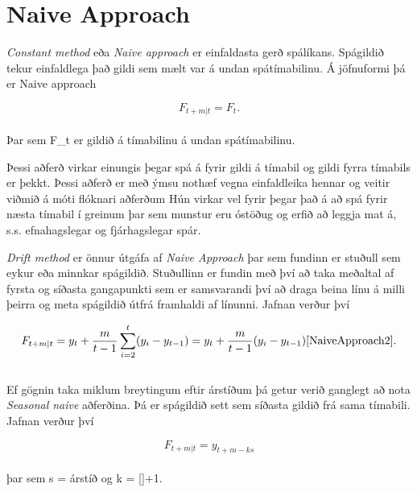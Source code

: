 \section{Naive Approach}
\textit{Constant method} eða \textit{Naive approach} er einfaldasta gerð spálíkans. Spágildið tekur einfaldlega það gildi sem mælt var á undan spátímabilinu. Á jöfnuformi þá er Naive approach

$$F_{t+m|t} = F_t.$$\\

Þar sem F_t er gildið á tímabilinu á undan spátímabilinu.

Þessi aðferð virkar einungis þegar spá á fyrir gildi á tímabil og gildi fyrra tímabils er þekkt.
Þessi aðferð er með ýmsu nothæf vegna einfaldleika hennar og veitir viðmið á móti flóknari aðferðum Hún virkar vel fyrir þegar það á að spá fyrir næsta tímabil í greinum þar sem munstur eru óstöðug og erfið að leggja mat á, s.s. efnahagslegar og fjárhagslegar spár\cite{NaiveApproach}.


\textit{Drift method} er önnur útgáfa af \textit{Naive Approach} þar sem fundinn er stuðull sem eykur eða minnkar spágildið. Stuðullinn er fundin með því að taka meðaltal af fyrsta og síðasta gangapunkti sem er samsvarandi því að draga beina línu á milli þeirra og meta spágildið útfrá framhaldi af línunni. Jafnan verður því

$$F_{t+m|t} = y_t + \frac{m}{t-1}\displaystyle\sum_{i=2}^{t} (y_i-y_{t-1}) = y_t + \frac{m}{t-1}(y_i-y_{t-1}) \cite{NaiveApproach2}.$$\\

Ef gögnin taka miklum breytingum eftir árstíðum þá getur verið ganglegt að nota \textit{Seasonal naive} aðferðina. Þá er spágildið sett sem síðasta gildið frá sama tímabili. Jafnan verður því

$$ F_{t+m|t} = y_{t+m-ks} $$\\

þar sem s = árstíð og k = []+1\cite{NaiveApproach2}.
